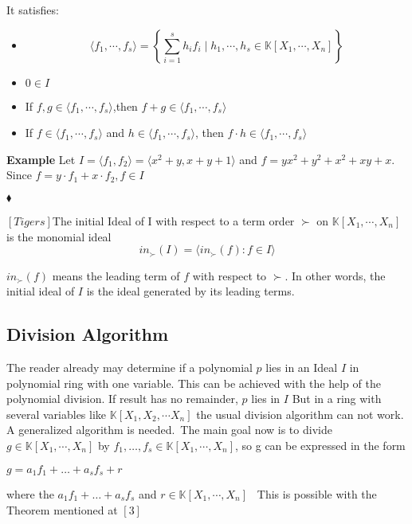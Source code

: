 It satisfies: \\
\begin{center}

\begin{itemize}
\item
\[ \langle f_{1}, \cdots , f_{s} \rangle = \left\lbrace  \sum_{i=1}^s h_{i}f_{i} \mid h_{1}, \cdots , h_{s} \in \mathbb{K}\left[X_{1}, \cdots, X_{n}\right] \right\rbrace \]
\item
$0 \in I$ 
\item
If $f,g \in \langle f_{1}, \cdots , f_{s} \rangle$,then  $f+g \in \langle f_{1}, \cdots , f_{s} \rangle$ 
\item
If $f \in \langle f_{1}, \cdots , f_{s} \rangle$ and $h \in  \langle f_{1}, \cdots , f_{s} \rangle$, then $f \cdot h \in \langle f_{1}, \cdots , f_{s} \rangle$
\end{itemize}

\end{center}


\textbf{Example} Let $ I= \langle f_{1},f_{2} \rangle = \langle x^{2}+y, x+y+1 \rangle $ and $f=yx^{2}+y^{2}+x^{2}+xy+x$. Since $f= y \cdot f_{1} + x \cdot f_{2}, f\in I$ \begin{flushright}
$\blacklozenge$
\end{flushright} 

\begin{env_definition}
$[Tigers]$The initial Ideal of I with respect to a term order $\succ$ on $\mathbb{K}\left[X_{1}, \cdots, X_{n}\right]$ is the monomial ideal \\
\[in_{\succ}(I) = \langle in_{\succ}(f) : f \in I  \rangle \] 

\end{env_definition}
$in_{\succ}(f)$ means the leading term of $f$ with respect to $\succ$. In other words, the initial ideal of $I$ is the ideal generated by its leading terms.



\subsection{Division Algorithm}

The reader already may determine if a polynomial $p$ lies in an Ideal $I$ in polynomial ring with one variable. This can be achieved with the help of the polynomial division.
If result has no remainder, $p$ lies in $I$
But in a ring with several variables like $ \mathbb{K} \left[X_{1},X_{2},\cdots X_{n}\right] $ the usual division algorithm can not work. A generalized algorithm is needed.\
The main goal now is to divide $g \in \mathbb{K}\left[X_{1}, \cdots, X_{n}\right] $ by 
$f_{1}, \ldots, f_{s} \in \mathbb{K}\left[X_{1}, \cdots, X_{n}\right]$, so g can be expressed in the form \begin{center}
$g = a_{1}f_{1}+ \ldots + a_{s}f_{s} +r$
\end{center} 
where the $a_{1}f_{1}+ \ldots + a_{s}f_{s} $ and $r \in \mathbb{K}\left[X_{1}, \cdots, X_{n}\right]$ \
This is possible with the Theorem mentioned at  $\left[ 3\right] $


